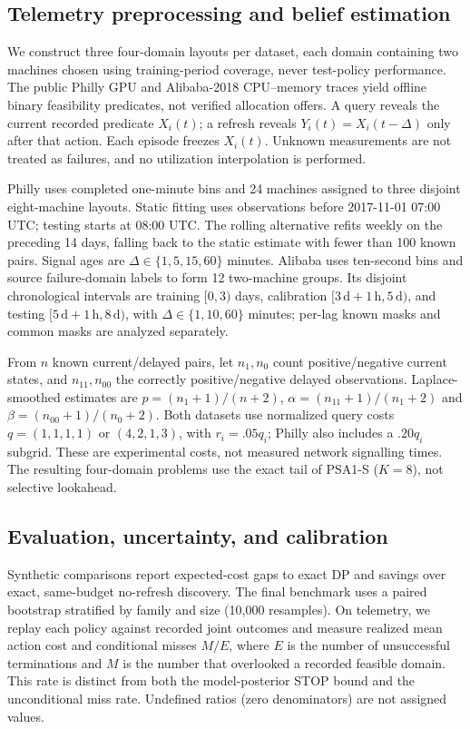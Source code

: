 \subsection{Telemetry preprocessing and belief estimation}
We construct three four-domain layouts per dataset, each domain containing two machines chosen using training-period coverage, never test-policy performance. The public Philly GPU and Alibaba-2018 CPU--memory traces yield offline binary feasibility predicates, not verified allocation offers. A query reveals the current recorded predicate $X_i(t)$; a refresh reveals $Y_i(t)=X_i(t-\Delta)$ only after that action. Each episode freezes $X_i(t)$. Unknown measurements are not treated as failures, and no utilization interpolation is performed.

Philly uses completed one-minute bins and 24 machines assigned to three disjoint eight-machine layouts. Static fitting uses observations before 2017-11-01 07:00 UTC; testing starts at 08:00 UTC. The rolling alternative refits weekly on the preceding 14 days, falling back to the static estimate with fewer than 100 known pairs. Signal ages are $\Delta\in\{1,5,15,60\}$ minutes. Alibaba uses ten-second bins and source failure-domain labels to form 12 two-machine groups. Its disjoint chronological intervals are training $[0,3)$ days, calibration $[3\,\mathrm d+1\,\mathrm h,5\,\mathrm d)$, and testing $[5\,\mathrm d+1\,\mathrm h,8\,\mathrm d)$, with $\Delta\in\{1,10,60\}$ minutes; per-lag known masks and common masks are analyzed separately.

From $n$ known current/delayed pairs, let $n_1,n_0$ count positive/negative current states, and $n_{11},n_{00}$ the correctly positive/negative delayed observations. Laplace-smoothed estimates are $p=(n_1+1)/(n+2)$, $\alpha=(n_{11}+1)/(n_1+2)$ and $\beta=(n_{00}+1)/(n_0+2)$. Both datasets use normalized query costs $q=(1,1,1,1)$ or $(4,2,1,3)$, with $r_i=.05q_i$; Philly also includes a $.20q_i$ subgrid. These are experimental costs, not measured network signalling times. The resulting four-domain problems use the exact tail of PSA1-S ($K=8$), not selective lookahead.

\subsection{Evaluation, uncertainty, and calibration}
Synthetic comparisons report expected-cost gaps to exact DP and savings over exact, same-budget no-refresh discovery. The final benchmark uses a paired bootstrap stratified by family and size (10,000 resamples). On telemetry, we replay each policy against recorded joint outcomes and measure realized mean action cost and conditional misses $M/E$, where $E$ is the number of unsuccessful terminations and $M$ is the number that overlooked a recorded feasible domain. This rate is distinct from both the model-posterior STOP bound and the unconditional miss rate. Undefined ratios (zero denominators) are not assigned values.

